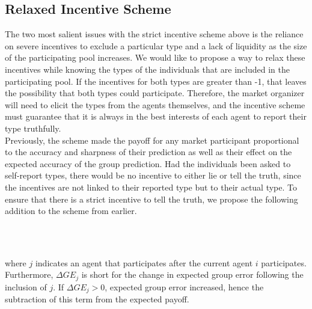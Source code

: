 \documentclass[twoside,twocolumn]{article}
\begin{document}
\subsection{Relaxed Incentive Scheme}

The two most salient issues with the strict incentive scheme above is the reliance on severe incentives to exclude a particular type and a lack of liquidity as the size of the participating pool increases. We would like to propose a way to relax these incentives while knowing the types of the individuals that are included in the participating pool. If the incentives for both types are greater than -1, that leaves the possibility that both types could participate. Therefore, the market organizer will need to elicit the types from the agents themselves, and the incentive scheme must guarantee that it is always in the best interests of each agent to report their type truthfully.\\

Previously, the scheme made the payoff for any market participant proportional to the accuracy and sharpness of their prediction as well as their effect on the expected accuracy of the group prediction. Had the individuals been asked to self-report types, there would be no incentive to either lie or tell the truth, since the incentives are not linked to their reported type but to their actual type. To ensure that there is a strict incentive to tell the truth, we propose the following addition to the scheme from earlier.
\newline

\\

\\
\newline

where $j$ indicates an agent that participates after the current agent $i$ participates. Furthermore, $\Delta GE_j$ is short for the change in expected group error following the inclusion of $j$. If $\Delta GE_j > 0$, expected group error increased, hence the subtraction of this term from the expected payoff.\\
\end{document}
